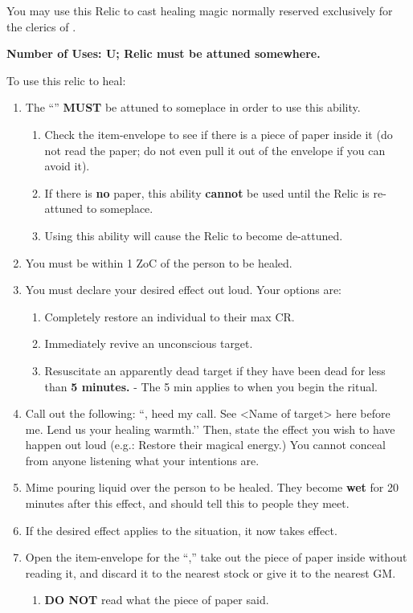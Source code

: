 \documentclass[green]{GL2020}
\begin{document}
\name{\gHealingRelic{}}

You may use this Relic to cast healing magic normally reserved exclusively for the clerics of \cFarmGod{}. 

\textbf{Number of Uses: U; Relic must be attuned somewhere.}

To use this relic to heal:
\begin{enumerate}
  \item The ``\iPitcher{}'' \textbf{MUST} be attuned to someplace in order to use this ability.
  \begin{enumerate}
    \item Check the item-envelope to see if there is a piece of paper inside it (do not read the paper; do not even pull it out of the envelope if you can avoid it).
    \item If there is \textbf{no} paper, this ability \textbf{cannot} be used until the Relic is re-attuned to someplace.
    \item Using this ability will cause the Relic to become de-attuned.
  \end{enumerate}
  \item You must be within 1 ZoC of the person to be healed.
  \item You must declare your desired effect out loud. Your options are:
  \begin{enumerate}
    \item Completely restore an individual to their max CR.
    \item Immediately revive an unconscious target.
    \item Resuscitate an apparently dead target if they have been dead for less than \textbf{5 minutes.} - The 5 min applies to when you begin the ritual.
  \end{enumerate}
  \item Call out the following: ``\cFarmGod{}, heed my call. See <Name of target> here before me. Lend us your healing warmth.’’ Then, state the effect you wish to have happen out loud (e.g.: Restore their magical energy.) You cannot conceal from anyone listening what your intentions are.
  \item Mime pouring liquid over the person to be healed. They become \textbf{wet} for 20 minutes after this effect, and should tell this to people they meet.
  \item If the desired effect applies to the situation, it now takes effect.
  \item Open the item-envelope for the ``\iPitcher{},'' take out the piece of paper inside without reading it, and discard it to the nearest stock or give it to the nearest GM.
  \begin{enumerate}
    \item \textbf{DO NOT} read what the piece of paper said.
  \end{enumerate}
\end{enumerate}
\end{document}
